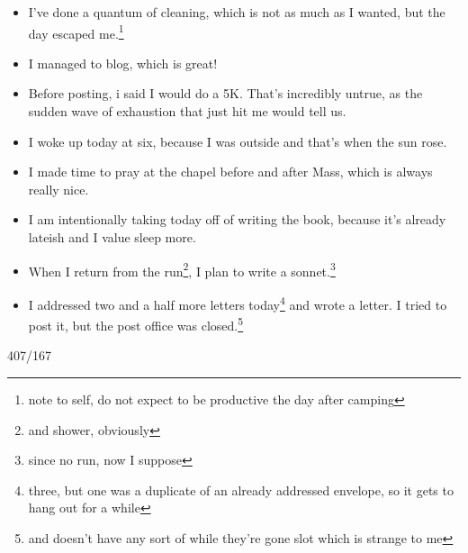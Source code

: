 \documentclass[12pt]{article}[titlepage]
\newcommand{\1}{\={a}}
\newcommand{\2}{\={e}}
\newcommand{\3}{\={\i}}
\newcommand{\4}{\=o}
\newcommand{\5}{\=u}
\newcommand{\6}{\={A}}
\renewcommand{\,}{\textsuperscript{,}}
\begin{document}
\begin{itemize}
\item I've done a quantum of cleaning, which is not as much as I wanted, but the day escaped me.\footnote{note to self, do not expect to be productive the day after camping}
\item I managed to blog, which is great!
\item Before posting, i said I would do a 5K. That's incredibly untrue, as the sudden wave of exhaustion that just hit me would tell us.
\item I woke up today at six, because I was outside and that's when the sun rose.
\item I made time to pray at the chapel before and after Mass, which is always really nice.
\item I am intentionally taking today off of writing the book, because it's already lateish and I value sleep more.
\item When I return from the run\footnote{and shower, obviously}, I plan to write a sonnet.\footnote{since no run, now I suppose}
\item I addressed two and a half more letters today\footnote{three, but one was a duplicate of an already addressed envelope, so it gets to hang out for a while} and wrote a letter.
I tried to post it, but the post office was closed.\footnote{and doesn't have any sort of while they're gone slot which is strange to me}
\end{itemize}


407/167
\end{document}

